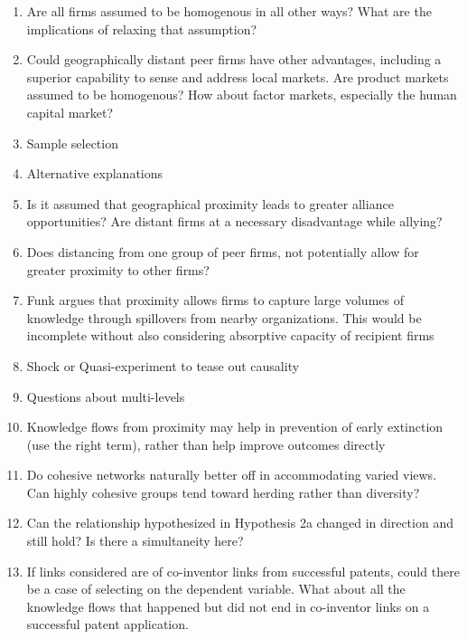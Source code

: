 \documentclass[12pt,letterpaper]{article}
\begin{document}
\begin{enumerate}
  \item Are all firms assumed to be homogenous in all other ways? What are the implications of relaxing that assumption?
  \item Could geographically distant peer firms have other advantages, including a superior capability to sense and address local markets. Are product markets assumed to be homogenous? How about factor markets, especially the human capital market?
  \item Sample selection
  \item Alternative explanations
  \item Is it assumed that geographical proximity leads to greater alliance opportunities? Are distant firms at a necessary disadvantage while allying?
  \item Does distancing from one group of peer firms, not potentially allow for greater proximity to other firms?
  \item Funk argues that proximity allows firms to capture large volumes of knowledge through spillovers from nearby organizations. This would be incomplete without also considering absorptive capacity of recipient firms
  \item Shock or Quasi-experiment to tease out causality
  \item Questions about multi-levels
  \item Knowledge flows from proximity may help in prevention of early extinction (use the right term), rather than help improve outcomes directly
  \item Do cohesive networks naturally better off in accommodating varied views. Can highly cohesive groups tend toward herding rather than diversity?
  \item Can the relationship hypothesized in Hypothesis 2a changed in direction and still hold? Is there a simultaneity here?
  \item If links considered are of co-inventor links from successful patents, could there be a case of selecting on the dependent variable. What about all the knowledge flows that happened but did not end in co-inventor links on a successful patent application.
\end{enumerate}

\begin{singlespace}
\renewcommand{\refname}{REFERENCES}
 

\end{singlespace}
\end{document}
